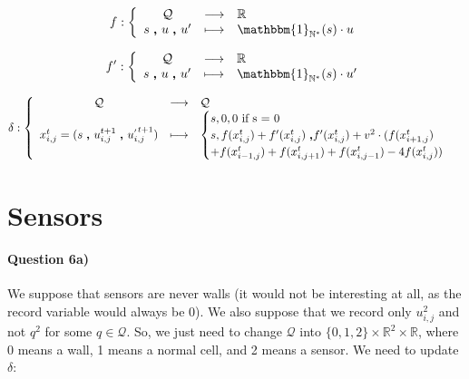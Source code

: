 \documentclass[a4paper,12pt]{article}
\begin{document}
\begin{eqnarray*}
f : \left \{ \begin{array}{c c l }
  \mathcal{Q} & \longrightarrow & \mathbb{R} \\
  s \ \pmb{,} \ u\ \pmb{,} \ u' & \longmapsto & \mathbbm{1}_{\mathbb{N}^*}(s) \cdot u
  \end{array} \right .
\end{eqnarray*}


\begin{eqnarray*}
f' : \left \{ \begin{array}{c c l }
  \mathcal{Q} & \longrightarrow & \mathbb{R} \\
  s \ \pmb{,} \ u\ \pmb{,} \ u' & \longmapsto & \mathbbm{1}_{\mathbb{N}^*}(s) \cdot u'
  \end{array} \right .
\end{eqnarray*}


\begin{eqnarray*}
\delta : \left \{ \begin{array}{c c l }
  \mathcal{Q} & \longrightarrow & \mathcal{Q} \\
  x_{i,j}^t = (s \ \pmb{,} \ u^{t+1}_{i,j}\ \pmb{,} \ u^{_{'} t+1}_{i,j}) & \longmapsto &
  \begin{cases}s, 0, 0\mbox{ if s = 0}\\
    s, f(x^{t}_{i,j}) + f'(x^t_{i,j})\ \pmb{,} f'(x^t_{i,j}) + v^2 \cdot (f(x^t_{i+1,j}) \\+ f(x^t_{i-1, j}) + f(x^t_{i, j+1}) + f(x^t_{i, j-1}) - 4 f(x^t_{i, j})) 
    \end{cases}\\
  \end{array} \right .
\end{eqnarray*}

\section{Sensors}

\paragraph{Question 6a)} We suppose that sensors are never walls (it would not be interesting at all, as the record variable would always be 0). We also suppose that we record only $u_{i,j}^2$ and not $q^2$ for some $q \in \mathcal{Q}$. So, we just need to change $\mathcal{Q}$ into $\{0,1,2\} \times \mathbb{R}^2 \times \mathbb{R}$, where 0 means a wall, 1 means a normal cell, and 2 means a sensor. We need to update $\delta$:
\end{document}
